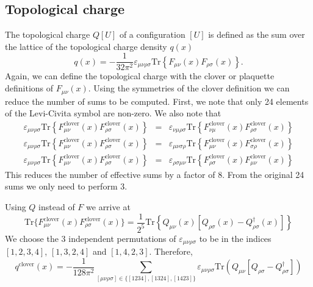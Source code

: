 \documentclass[12pt,a4paper]{article}
\begin{document}
\subsection{Topological charge}
The topological charge $Q[U]$ of a configuration $[U]$ is defined as the sum over the lattice of the topological charge density $q(x)$ 
\begin{equation}
    q(x) = -\frac{1}{32\pi^2}\varepsilon_{\mu\nu\rho\sigma} \text{Tr} \left\{ F_{\mu\nu}(x)F_{\rho\sigma}(x)\right\}.
\end{equation}
Again, we can define the topological charge with the clover or plaquette definitions of $F_{\mu\nu}(x)$. Using the symmetries of the clover definition we can reduce the number of sums to be computed. First, we note that only 24 elements of the Levi-Civita symbol are non-zero. We also note that
\begin{eqnarray}
    \varepsilon_{\mu\nu\rho\sigma} \text{Tr} \left\{ F^{\text{clover}}_{\mu\nu}(x)F^{\text{clover}}_{\rho\sigma}(x)\right\} & = & \varepsilon_{\nu\mu\rho\sigma} \text{Tr} \left\{ F^{\text{clover}}_{\nu\mu}(x)F^{\text{clover}}_{\rho\sigma}(x)\right\} \\
    \varepsilon_{\mu\nu\rho\sigma} \text{Tr} \left\{ F^{\text{clover}}_{\mu\nu}(x)F^{\text{clover}}_{\rho\sigma}(x)\right\} & = & \varepsilon_{\mu\nu\sigma\rho} \text{Tr} \left\{ F^{\text{clover}}_{\mu\nu}(x)F^{\text{clover}}_{\sigma\rho}(x)\right\} \\
    \varepsilon_{\mu\nu\rho\sigma} \text{Tr} \left\{ F^{\text{clover}}_{\mu\nu}(x)F^{\text{clover}}_{\rho\sigma}(x)\right\} & = & \varepsilon_{\rho\sigma\mu\nu} \text{Tr} \left\{F^{\text{clover}}_{\rho\sigma} (x)F^{\text{clover}}_{\mu\nu}(x)\right\}
\end{eqnarray} 
This reduces the number of effective sums by a factor of 8. From the original 24 sums we only need to perform 3.

Using $Q$ instead of $F$ we arrive at
\begin{equation}
    \text{Tr}\{F^{\text{clover}}_{\mu\nu}(x)F^{\text{clover}}_{\rho\sigma}(x)\} =\frac{1}{2^5} \text{Tr}\left\{Q_{\mu\nu}(x)[Q_{\rho\sigma}(x)-Q_{\rho\sigma}^{\dagger}(x)]\right\}
\end{equation}
We choose the 3 independent permutations of $\varepsilon_{\mu\nu\rho\sigma}$ to be in the indices $[1,2,3,4]$, $[1,3,2,4]$ and $[1,4,2,3]$. Therefore,
\begin{equation}
    q^{\text{clover}}(x) = -\frac{1}{128 \pi^2} \sum_{[\mu\nu\rho\sigma] \in\{ [1234], [1324], [1423]\}}
              \varepsilon_{\mu\nu\rho\sigma}\text{Tr}(Q_{\mu\nu}[Q_{\rho\sigma}-Q_{\rho\sigma}^{\dagger}]) 
\end{equation}
\end{document}
